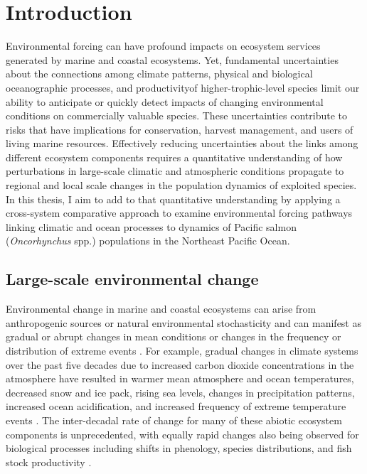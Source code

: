 
\chapter[Introduction]{Introduction}
\label{ch:intro}

Environmental forcing can have profound impacts on ecosystem services generated
by marine and coastal ecosystems. Yet, fundamental uncertainties about the
connections among climate patterns, physical and biological oceanographic
processes, and productivity\footnotemark[1] of higher-trophic-level species
limit our ability to anticipate or quickly detect impacts of changing
environmental conditions on commercially valuable species. These uncertainties
contribute to risks that have implications for conservation, harvest management,
and users of living marine resources. Effectively reducing uncertainties about
the links among different ecosystem components requires a quantitative
understanding of how perturbations in large-scale climatic and atmospheric
conditions propagate to regional and local scale changes in the population
dynamics of exploited species. In this thesis, I aim to add to that quantitative
understanding by applying a cross-system comparative approach to examine
environmental forcing pathways linking climatic and ocean processes to dynamics
of Pacific salmon (\emph{Oncorhynchus} spp.) populations in the Northeast
Pacific Ocean.



\section{Large-scale environmental change}

Environmental change in marine and coastal ecosystems can arise from
anthropogenic sources or natural environmental stochasticity and can manifest as
gradual or abrupt changes in mean conditions or changes in the frequency or
distribution of extreme events \citep{Jentsch2007}. For example, gradual changes
in climate systems over the past five decades due to increased carbon dioxide
concentrations in the atmosphere have resulted in warmer mean atmosphere and
ocean temperatures, decreased snow and ice pack, rising sea levels, changes in
precipitation patterns, increased ocean acidification, and increased frequency
of extreme temperature events \citep{IPCC2013a}. The inter-decadal rate of
change for many of these abiotic ecosystem components is unprecedented, with
equally rapid changes also being observed for biological processes including
shifts in phenology, species distributions, and fish stock productivity
\citep{IPCC2013a, Taylor2008a, Pinsky2013, Peterman2012}.

